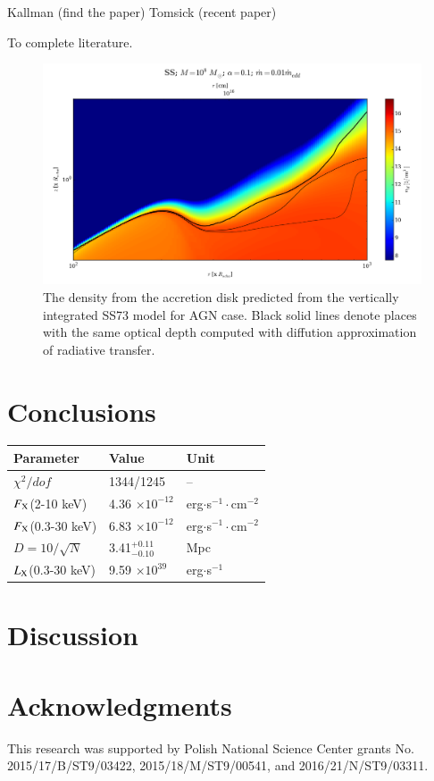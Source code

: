 \documentclass[preprint2]{aastex6}
\begin{document}
Kallman (find the paper)
Tomsick (recent paper) 

To complete literature. 


\begin{figure}
 \includegraphics[scale=0.62]{plot_ss_r100.png}
 \caption{The density from the accretion disk predicted from the vertically integrated SS73 model for AGN case.  
 Black solid lines denote places with the same optical depth computed with diffution approximation of radiative transfer.}
 \label{fig:counts*}
\end{figure}



\section{Conclusions}
\label{sec:results}


\begin{table}
\begin{center}
\begin{tabular}{lll}
\hline 
Parameter & Value & Unit \\ 
\hline\hline
$\chi^2/dof$ & 1344/1245  & -- \\
$F_{\rm X}$(2-10 keV) & 4.36 $\times10^{-12}$ & erg$\cdot$s$^{-1}\cdot$cm$^{-2}$\\
$F_{\rm X}$(0.3-30 keV) & 6.83 $\times10^{-12}$ & erg$\cdot$s$^{-1}\cdot$cm$^{-2}$\\
$D=10/\sqrt{N}$ & 3.41$^{+0.11}_{-0.10}$ & Mpc\\ 
$ L_{\rm X}$(0.3-30 keV)  & 9.59 $\times10^{39}$& erg$\cdot$s$^{-1}$\\ 
\hline 
\end{tabular}
\end{center}
\end{table}


\section{Discussion}
\label{sec:sum}


\section*{Acknowledgments}

This research was supported by Polish National Science 
Center grants No. 2015/17/B/ST9/03422, 2015/18/M/ST9/00541, and 2016/21/N/ST9/03311.  



\end{document}
